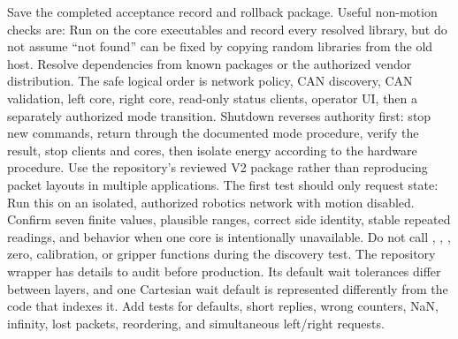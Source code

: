 Save the completed acceptance record and rollback package.\markdownRendererOlItemEnd 
\markdownRendererOlEnd \markdownRendererInterblockSeparator
{}Useful non-motion checks are:\markdownRendererInterblockSeparator
{}\markdownRendererInterblockSeparator
{}Run  on the core executables and record every resolved library, but do not assume “not found” can be fixed by copying random libraries from the old host. Resolve dependencies from known packages or the authorized vendor distribution.\markdownRendererInterblockSeparator
{}
\markdownRendererSectionEnd \markdownRendererSectionBegin
{}\markdownRendererInterblockSeparator
{}The safe logical order is network policy, CAN discovery, CAN validation, left core, right core, read-only status clients, operator UI, then a separately authorized mode transition. Shutdown reverses authority first: stop new commands, return through the documented mode procedure, verify the result, stop clients and cores, then isolate energy according to the hardware procedure.\markdownRendererInterblockSeparator
{}
\markdownRendererSectionEnd 
\markdownRendererSectionEnd \markdownRendererSectionBegin
{}\markdownRendererInterblockSeparator
{}Use the repository's reviewed V2 package rather than reproducing packet layouts in multiple applications. The first test should only request state:\markdownRendererInterblockSeparator
{}\markdownRendererInterblockSeparator
{}Run this on an isolated, authorized robotics network with motion disabled. Confirm seven finite values, plausible ranges, correct side identity, stable repeated readings, and behavior when one core is intentionally unavailable. Do not call , , , zero, calibration, or gripper functions during the discovery test.\markdownRendererParagraphSeparator
{}The repository wrapper has details to audit before production. Its default wait tolerances differ between layers, and one Cartesian wait default is represented differently from the code that indexes it. Add tests for defaults, short replies, wrong counters, NaN, infinity, lost packets, reordering, and simultaneous left/right requests.\markdownRendererInterblockSeparator
